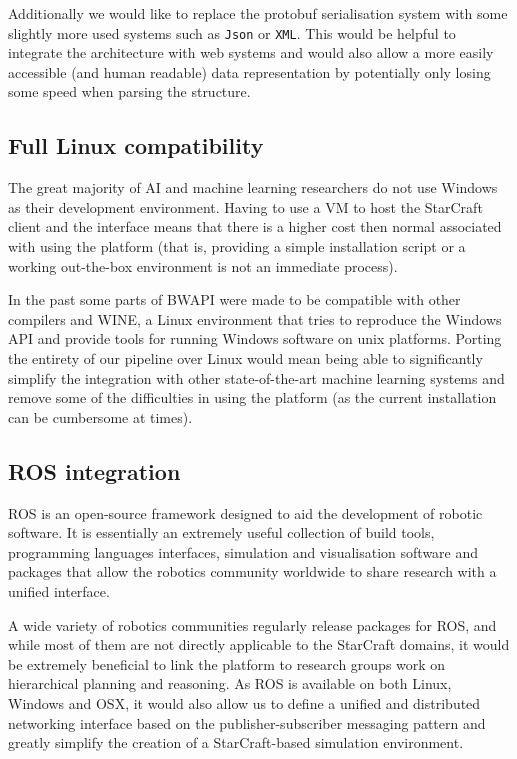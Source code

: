 Additionally we would like to replace the protobuf serialisation system with
some slightly more used systems such as \texttt{Json} or \texttt{XML}. This
would be helpful to integrate the architecture with web systems and would also
allow a more easily accessible (and human readable) data representation by
potentially only losing some speed when parsing the structure.

\subsection{Full Linux compatibility}

The great majority of AI and machine learning researchers do not use Windows as
their development environment. Having to use a VM to host the StarCraft client
and the interface means that there is a higher cost then normal associated with
using the platform (that is, providing a simple installation script or a working
out-the-box environment is not an immediate process).

In the past some parts of BWAPI were made to be compatible with other compilers
and WINE, a Linux environment that tries to reproduce the Windows API and
provide tools for running Windows software on unix platforms. Porting the
entirety of our pipeline over Linux would mean being able to significantly
simplify the integration with other state-of-the-art machine learning systems
and remove some of the difficulties in using the platform (as the current
installation can be cumbersome at times).


\subsection{ROS integration}

ROS is an open-source framework designed to aid the development of robotic
software. It is essentially an extremely useful collection of build tools,
programming languages interfaces, simulation and visualisation software and
packages that allow the robotics community worldwide to share research with a
unified interface.

A wide variety of robotics communities regularly release packages for ROS, and
while most of them are not directly applicable to the StarCraft domains, it
would be extremely beneficial to link the platform to research groups work on
hierarchical planning and reasoning. As ROS is available on both Linux, Windows
and OSX, it would also allow us to define a unified and distributed networking
interface based on the publisher-subscriber messaging pattern and greatly
simplify the creation of a StarCraft-based simulation environment.


